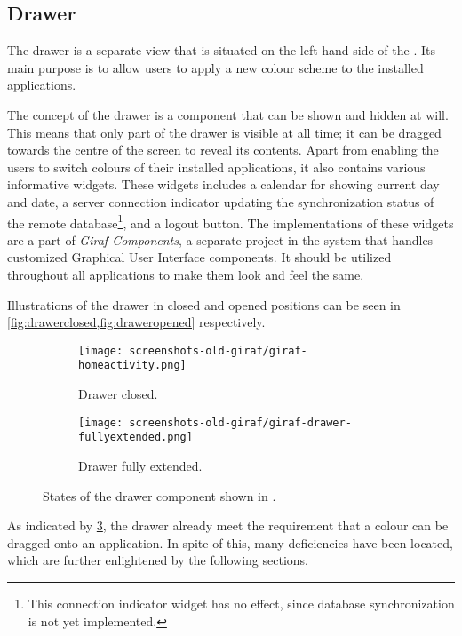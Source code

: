 \subsection{Drawer}\label{sec:launcher:drawer}
The drawer is a separate view that is situated on the left-hand side of the \homeactivity.
Its main purpose is to allow \launcher users to apply a new colour scheme to the installed \giraf applications.

The concept of the drawer is a component that can be shown and hidden at will.
This means that only part of the drawer is visible at all time; it can be dragged towards the centre of the screen to reveal its contents.
Apart from enabling the users to switch colours of their installed \giraf applications, it also contains various informative widgets.
These widgets includes a calendar for showing current day and date, a server connection indicator updating the synchronization status of the remote database\footnote{This connection indicator widget has no effect, since database synchronization is not yet implemented.}, and a logout button.
The implementations of these widgets are a part of \textit{Giraf Components}, a separate project in the \giraf system that handles customized Graphical User Interface components.
It should be utilized throughout all \giraf applications to make them look and feel the same.

Illustrations of the drawer in closed and opened positions can be seen in \cref{fig:drawerclosed,fig:draweropened} respectively.

\begin{figure}[h] %
\centering
	\begin{subfigure}[b]{.48\textwidth}
	\centering
	\texttt{[image: screenshots-old-giraf/giraf-homeactivity.png]}
	\caption{Drawer closed.}
	\label{fig:drawerclosed}
	\end{subfigure}
	\hfill
	\begin{subfigure}[b]{.48\textwidth}
	\centering
	\texttt{[image: screenshots-old-giraf/giraf-drawer-fullyextended.png]}
	\caption{Drawer fully extended.}
	\label{fig:draweropened}
	\end{subfigure}
\caption{States of the drawer component shown in \homeactivity.}
\label{fig:drawerstates}
\end{figure}

As indicated by \cref{fig:drawerstates}, the drawer already meet the requirement that a colour can be dragged onto an application.
In spite of this, many deficiencies have been located, which are further enlightened by the following sections.

